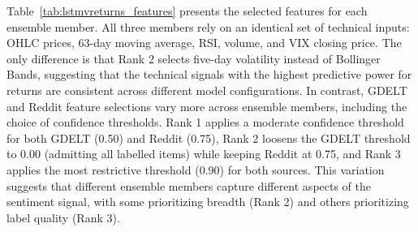 Table~\ref{tab:lstmvreturns_features} presents the selected features for each ensemble member.
All three members rely on an identical set of technical inputs: OHLC prices, 63-day moving average, RSI, volume, and VIX closing price. The only difference is that Rank 2 selects five-day volatility instead of Bollinger Bands, suggesting that the technical signals with the highest predictive power for returns are consistent across different model configurations. In contrast, GDELT and Reddit feature selections vary more across ensemble members, including the choice of confidence thresholds. Rank 1 applies a moderate confidence threshold for both GDELT (0.50) and Reddit (0.75), Rank 2 loosens the GDELT threshold to 0.00 (admitting all labelled items) while keeping Reddit at 0.75, and Rank 3 applies the most restrictive threshold (0.90) for both sources. This variation suggests that different ensemble members capture different aspects of the sentiment signal, with some prioritizing breadth (Rank 2) and others prioritizing label quality (Rank 3).

